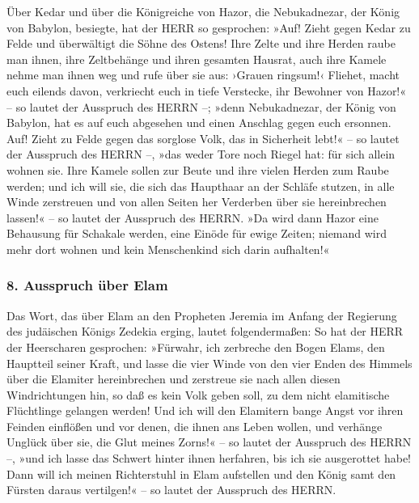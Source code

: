 Über Kedar und über die Königreiche von Hazor, die
Nebukadnezar, der König von Babylon, besiegte, hat der HERR so
gesprochen: »Auf! Zieht gegen Kedar zu Felde und überwältigt die Söhne
des Ostens! Ihre Zelte und ihre Herden raube man ihnen,
ihre Zeltbehänge und ihren gesamten Hausrat, auch ihre Kamele nehme man
ihnen weg und rufe über sie aus: ›Grauen ringsum!‹
Fliehet, macht euch eilends davon, verkriecht euch in
tiefe Verstecke, ihr Bewohner von Hazor!« -- so lautet der Ausspruch des
HERRN --; »denn Nebukadnezar, der König von Babylon, hat es auf euch
abgesehen und einen Anschlag gegen euch ersonnen. Auf!
Zieht zu Felde gegen das sorglose Volk, das in Sicherheit lebt!« -- so
lautet der Ausspruch des HERRN --, »das weder Tore noch Riegel hat: für
sich allein wohnen sie. Ihre Kamele sollen zur Beute und
ihre vielen Herden zum Raube werden; und ich will sie, die sich das
Haupthaar an der Schläfe stutzen, in alle Winde zerstreuen und von allen
Seiten her Verderben über sie hereinbrechen lassen!« -- so lautet der
Ausspruch des HERRN. »Da wird dann Hazor eine Behausung
für Schakale werden, eine Einöde für ewige Zeiten; niemand wird mehr
dort wohnen und kein Menschenkind sich darin aufhalten!«

\hypertarget{ausspruch-uxfcber-elam}{%
\subsubsection{8. Ausspruch über Elam}\label{ausspruch-uxfcber-elam}}

Das Wort, das über Elam an den Propheten Jeremia im
Anfang der Regierung des judäischen Königs Zedekia erging, lautet
folgendermaßen: So hat der HERR der Heerscharen
gesprochen: »Fürwahr, ich zerbreche den Bogen Elams, den Hauptteil
seiner Kraft, und lasse die vier Winde von den vier Enden
des Himmels über die Elamiter hereinbrechen und zerstreue sie nach allen
diesen Windrichtungen hin, so daß es kein Volk geben soll, zu dem nicht
elamitische Flüchtlinge gelangen werden! Und ich will den
Elamitern bange Angst vor ihren Feinden einflößen und vor denen, die
ihnen ans Leben wollen, und verhänge Unglück über sie, die Glut meines
Zorns!« -- so lautet der Ausspruch des HERRN --, »und ich lasse das
Schwert hinter ihnen herfahren, bis ich sie ausgerottet habe!
Dann will ich meinen Richterstuhl in Elam aufstellen und
den König samt den Fürsten daraus vertilgen!« -- so lautet der Ausspruch
des HERRN.

